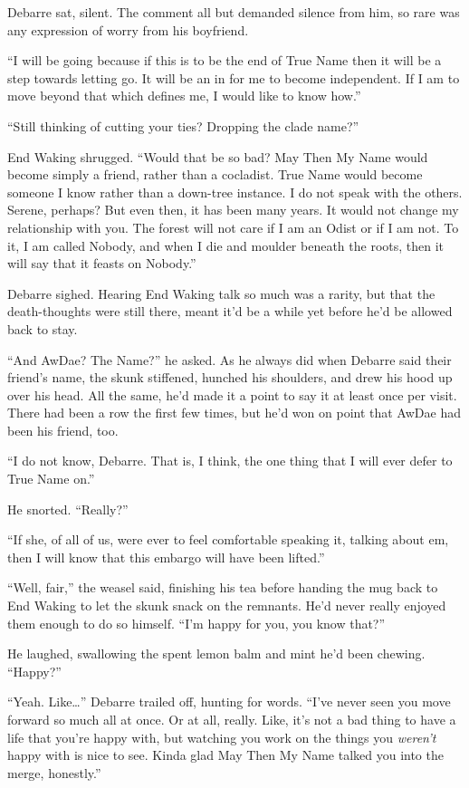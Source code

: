 Debarre sat, silent. The comment all but demanded silence from him, so rare was any expression of worry from his boyfriend.

``I will be going because if this is to be the end of True Name then it will be a step towards letting go. It will be an in for me to become independent. If I am to move beyond that which defines me, I would like to know how.''

``Still thinking of cutting your ties? Dropping the clade name?''

End Waking shrugged. ``Would that be so bad? May Then My Name would become simply a friend, rather than a cocladist. True Name would become someone I know rather than a down-tree instance. I do not speak with the others. Serene, perhaps? But even then, it has been many years. It would not change my relationship with you. The forest will not care if I am an Odist or if I am not. To it, I am called Nobody, and when I die and moulder beneath the roots, then it will say that it feasts on Nobody.''

Debarre sighed. Hearing End Waking talk so much was a rarity, but that the death-thoughts were still there, meant it'd be a while yet before he'd be allowed back to stay.

``And AwDae? The Name?'' he asked. As he always did when Debarre said their friend's name, the skunk stiffened, hunched his shoulders, and drew his hood up over his head. All the same, he'd made it a point to say it at least once per visit. There had been a row the first few times, but he'd won on point that AwDae had been his friend, too.

``I do not know, Debarre. That is, I think, the one thing that I will ever defer to True Name on.''

He snorted. ``Really?''

``If she, of all of us, were ever to feel comfortable speaking it, talking about em, then I will know that this embargo will have been lifted.''

``Well, fair,'' the weasel said, finishing his tea before handing the mug back to End Waking to let the skunk snack on the remnants. He'd never really enjoyed them enough to do so himself. ``I'm happy for you, you know that?''

He laughed, swallowing the spent lemon balm and mint he'd been chewing. ``Happy?''

``Yeah. Like\ldots{}'' Debarre trailed off, hunting for words. ``I've never seen you move forward so much all at once. Or at all, really. Like, it's not a bad thing to have a life that you're happy with, but watching you work on the things you \emph{weren't} happy with is nice to see. Kinda glad May Then My Name talked you into the merge, honestly.''

